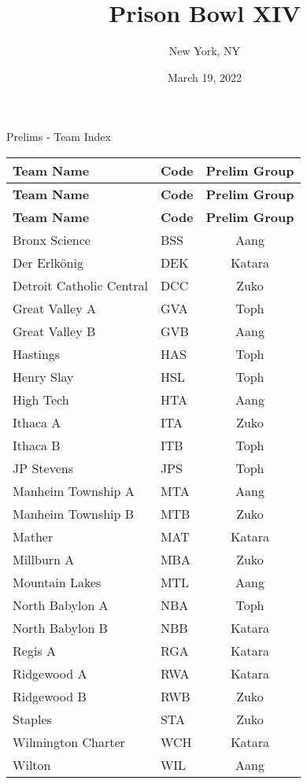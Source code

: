 \documentclass{article}%
\title{Prison Bowl XIV}%
\author{New York, NY}%
\date{March 19, 2022}%
\begin{document}
%
\normalsize%
%
\maketitle%
\vspace*{48pt}%
\begin{center}%
\begin{Huge}%
Prelims {-} Team Index%
\end{Huge}%
\end{center}%
\newpage%
\pagestyle{fancy}%
\fancyhf{}%
%
%
%
%
%
\begin{longtable}{|ll|c|}%
\rowcolor{gray!30}%
\hline%
\textbf{Team Name} & \textbf{Code}&\textbf{Prelim Group}\\%
\hline%
\endhead%
\hline%
\rowcolor{gray!25}%
\textbf{Team Name} & \textbf{Code}&\textbf{Prelim Group}\\%
\hline%
\endfoot%
\hline%
\hline\rowcolor{gray!25}%
\textbf{Team Name} & \textbf{Code}&\textbf{Prelim Group}\\%
\hline%
\endlastfoot%
\hline%
Bronx Science&BSS&Aang\\%
Der Erlkönig&DEK&Katara\\%
Detroit Catholic Central&DCC&Zuko\\%
Great Valley A&GVA&Toph\\%
Great Valley B&GVB&Aang\\%
Hastings&HAS&Toph\\%
Henry Slay&HSL&Toph\\%
High Tech&HTA&Aang\\%
Ithaca A&ITA&Zuko\\%
Ithaca B&ITB&Toph\\%
JP Stevens&JPS&Toph\\%
Manheim Township A&MTA&Aang\\%
Manheim Township B&MTB&Zuko\\%
Mather&MAT&Katara\\%
Millburn A&MBA&Zuko\\%
Mountain Lakes&MTL&Aang\\%
North Babylon A&NBA&Toph\\%
North Babylon B&NBB&Katara\\%
Regis A&RGA&Katara\\%
Ridgewood A&RWA&Katara\\%
Ridgewood B&RWB&Zuko\\%
Staples&STA&Zuko\\%
Wilmington Charter&WCH&Katara\\%
Wilton&WIL&Aang\\%
\end{longtable}%
\end{document}
